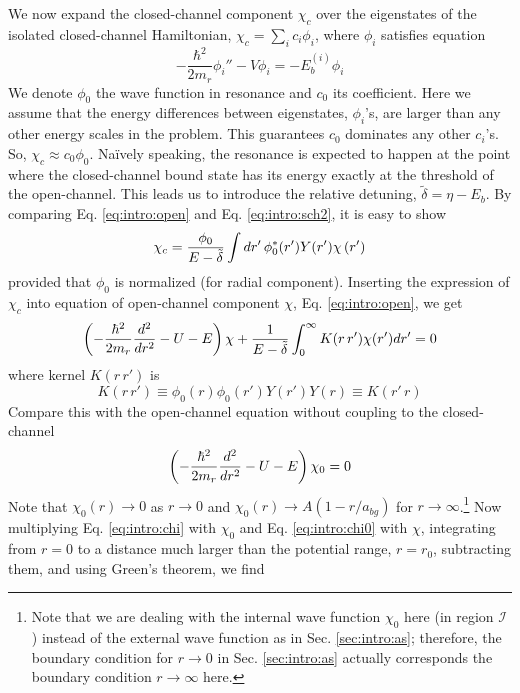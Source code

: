 We now expand the closed-channel component $\chi_{c}$ over the eigenstates of the isolated closed-channel Hamiltonian, $\chi_{c}=\sum_{i}c_{i}\phi_{i}$, where $\phi_{i}$ satisfies \sch equation
\begin{equation}\label{eq:intro:sch2}
-\frac{\hbar^{2}}{2m_{r}}\phi_{i}''-V \phi_{i}=-E_{b}^{(i)}\phi_{i}
\end{equation}
We denote $\phi_{0}$  the wave function  in resonance and $c_{0}$ its coefficient.  Here we assume that the energy differences between eigenstates, $\phi_{i}$'s, are larger than any other energy scales in the problem.  This guarantees $c_{0}$ dominates any other $c_{i}$'s.  So, $\chi_{c}\approx{}c_{0}\phi_{0}$.  Na\"{i}vely speaking, the resonance is expected to happen at the point where the closed-channel bound state has its energy exactly at the threshold of the open-channel.  This leads us to introduce the relative detuning, $\tilde\delta=\eta-E_{b}$. By comparing Eq. \ref{eq:intro:open} and Eq. \ref{eq:intro:sch2}, it is easy to show 
\begin{equation}\label{eq:intro:closeCoeff}
\chi_{c}=\frac{\phi_{0}}{E-\tilde\delta}\int{dr'}\,\phi_{0}^{*}(r')Y(r')\chi\left(r'\right)
\end{equation}
provided that  $\phi_{0}$ is normalized (for radial component).  Inserting the expression of $\chi_{c}$ into \sch equation of open-channel component $\chi$, Eq. \ref{eq:intro:open}, we get 
\begin{equation}\label{eq:intro:chi}
\left(-\frac{\hbar^{2}}{2m_{r}}\frac{d^{2}}{dr^{2}}-U-E\right)\chi+\frac{1}{E-\tilde\delta}\int_{0}^{\infty}K(r\,r')\chi(r')dr'=0
\end{equation}
where kernel $K(r\,r')$ is
\begin{equation}\label{eq:intro:Krr}
K(r\,r')\equiv\phi_{0}(r)\phi_{0}(r')Y(r')Y(r)\equiv{}K(r'\,r)
\end{equation}
Compare this with the open-channel  \sch equation without coupling to the closed-channel
\begin{equation}\label{eq:intro:chi0}
\left(-\frac{\hbar^{2}}{2m_{r}}\frac{d^{2}}{dr^{2}}-U-E\right)\chi_{0}=0
\end{equation}
Note that $\chi_{0}(r)\rightarrow0$ as $r\rightarrow0$ and $\chi_{0}(r)\rightarrow{A}(1-r/a_{bg})\label{eq:intro:abg}$ for $r\rightarrow\infty$.\footnote{Note that we are dealing with the internal wave function $\chi_{0}$ here (in region $\mathcal{I}$) instead of the external wave function as in Sec. \ref{sec:intro:as}; therefore, the boundary condition for $r\rightarrow0$ in Sec. \ref{sec:intro:as} actually corresponds the boundary condition $r\rightarrow\infty$ here.} Now multiplying Eq. \ref{eq:intro:chi} with $\chi_{0}$ and Eq. \ref{eq:intro:chi0} with $\chi$, integrating from $r=0$ to a  distance much larger than the potential range, $r=r_{0}$, subtracting them, and using Green's theorem, we find 
